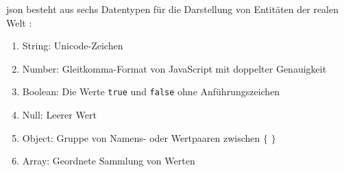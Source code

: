 \ac{json} besteht aus sechs Datentypen für die Darstellung von Entitäten der realen Welt \cite{jsondef}:
\begin{enumerate}
	\item String: Unicode-Zeichen
	\item Number: Gleitkomma-Format von JavaScript mit doppelter Genauigkeit
	\item Boolean: Die Werte \texttt{true} und \texttt{false} ohne Anführungszeichen
	\item Null: Leerer Wert
	\item Object: Gruppe von Namens- oder Wertpaaren zwischen $\{$ $\}$
	\item Array: Geordnete Sammlung von Werten
\end{enumerate}
